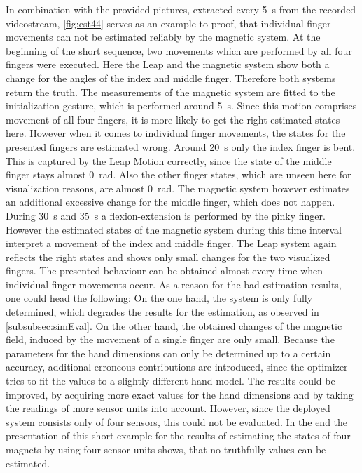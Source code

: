 In combination with the provided pictures, extracted every \SI{5}{\second} from the recorded videostream, \ref{fig:est44} serves as an example to proof, that individual finger movements can not be estimated reliably by the magnetic system. At the beginning of the short sequence, two movements which are performed by all four fingers were executed. Here the Leap and the magnetic system show both a change for the angles of the index and middle finger. Therefore both systems return the truth. The measurements of the magnetic system are fitted to the initialization gesture, which is performed around \SI{5}{\second}. Since this motion comprises movement of all four fingers, it is more likely to get the right estimated states here. However when it comes to individual finger movements, the states for the presented fingers are estimated wrong. Around \SI{20}{\second} only the index finger is bent. This is captured by the Leap Motion correctly, since the state of the middle finger stays almost \SI{0}{\radian}. Also the other finger states, which are unseen here for visualization reasons, are almost \SI{0}{\radian}. The magnetic system however estimates an additional excessive change for the middle finger, which does not happen. During \SI{30}{\second} and \SI{35}{\second} a flexion-extension is performed by the pinky finger. However the estimated states of the magnetic system during this time interval interpret a movement of the index and middle finger. The Leap system again reflects the right states and shows only small changes for the two visualized fingers. The presented behaviour can be obtained almost every time when individual finger movements occur. As a reason for the bad estimation results, one could head the following: On the one hand, the system is only fully determined, which degrades the results for the estimation, as observed in \ref{subsubsec:simEval}. On the other hand, the obtained changes of the magnetic field, induced by the movement of a single finger are only small. Because the parameters for the hand dimensions can only be determined up to a certain accuracy, additional erroneous contributions are introduced, since the optimizer tries to fit the values to a slightly different hand model. The results could be improved, by acquiring more exact values for the hand dimensions and by taking the readings of more sensor units into account. However, since the deployed system consists only of four sensors, this could not be evaluated. In the end the presentation of this short example for the results of estimating the states of four magnets by using four sensor units shows, that no truthfully values can be estimated.


